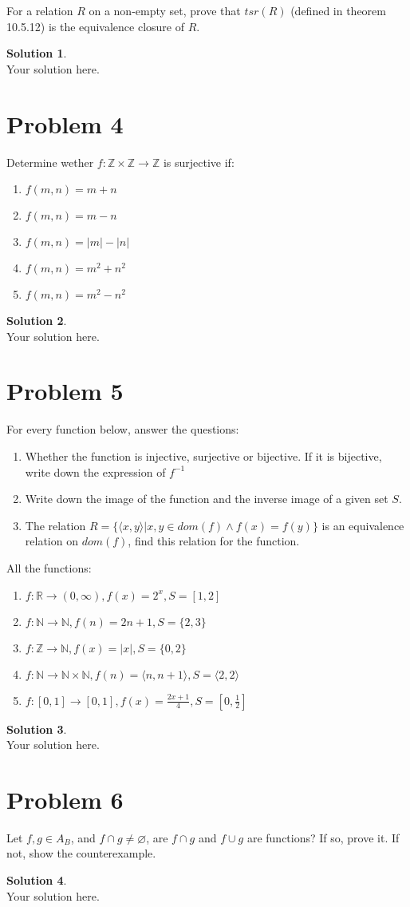 \documentclass[a4paper,UTF8]{article}
\theoremstyle{definition}
\newtheorem*{solution}{Solution}
\begin{document}
For a relation $R$ on a non-empty set, prove that $tsr(R)$ (defined in theorem 10.5.12) is the equivalence closure of $R$.
\begin{solution}
	~\\
	Your solution here.
\end{solution}



\section*{Problem 4}
Determine wether $f:\mathbb{Z}\times \mathbb{Z}\rightarrow \mathbb{Z}$ is surjective if:
\begin{enumerate}
	\item $f(m,n)=m+n$
	\item $f(m,n)=m-n$
	\item $f(m,n)=|m|-|n|$
	\item $f(m,n)=m^2+n^2$
	\item $f(m,n)=m^2-n^2$
\end{enumerate}
\begin{solution}
	~\\
	Your solution here.
\end{solution}


\section*{Problem 5}
For every function below, answer the questions:

\begin{enumerate}
	\item Whether the function is injective, surjective or bijective. If it is bijective, write down the expression of $f^{-1}$
	\item Write down the image of the function and the inverse image of a given set $S$.
	\item The relation $R=\{\langle x,y\rangle | x,y \in dom(f) \land f(x)=f(y)\}$ is an equivalence relation on $dom(f)$, find this relation for the function.
\end{enumerate}

All the functions:
\begin{enumerate}
	\item $f:\mathbb{R}\rightarrow (0,\infty),f(x)=2^x,S=[1,2]$
	\item $f:\mathbb{N}\rightarrow \mathbb{N},f(n)=2n+1,S=\{2,3\}$
	\item $f:\mathbb{Z}\rightarrow \mathbb{N},f(x)=|x|,S=\{0,2\}$
	\item $f:\mathbb{N}\rightarrow \mathbb{N}\times \mathbb{N},f(n)=\langle n,n+1\rangle,S={\langle 2,2\rangle }$
	\item $f:[0,1]\rightarrow [0,1],f(x)=\frac{2x+1}{4},S=[0,\frac{1}{2}]$
\end{enumerate}

\begin{solution}
	~\\
	Your solution here.
\end{solution}


\section*{Problem 6}
Let $f,g \in A_B$, and $f\cap g\neq \varnothing$, are $f\cap g$ and $f\cup g$ are functions? If so, prove it. If not, show the counterexample. 
\begin{solution}
	~\\
	Your solution here.
\end{solution}
\end{document}
